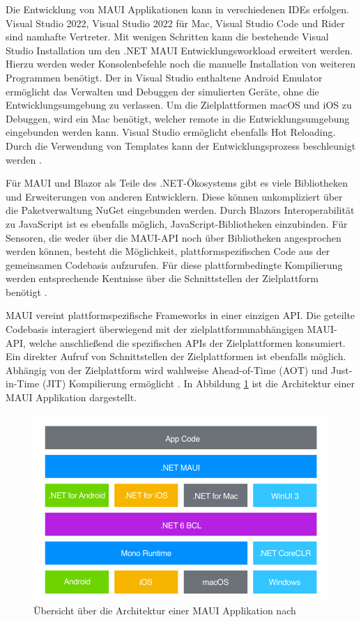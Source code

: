 \documentclass[]{lni}
\begin{document}
Die Entwicklung von MAUI Applikationen kann in verschiedenen IDEs erfolgen. Visual Studio 2022, Visual Studio 2022 für Mac, Visual Studio Code und Rider sind namhafte Vertreter. Mit wenigen Schritten kann die bestehende Visual Studio Installation um den .NET MAUI Entwicklungsworkload erweitert werden. Hierzu werden weder Konsolenbefehle noch die manuelle Installation von weiteren Programmen benötigt. Der in Visual Studio enthaltene Android Emulator ermöglicht das Verwalten und Debuggen der simulierten Geräte, ohne die Entwicklungsumgebung zu verlassen. Um die Zielplattformen macOS und iOS zu Debuggen, wird ein Mac benötigt, welcher remote in die Entwicklungsumgebung eingebunden werden kann. Visual Studio ermöglicht ebenfalls Hot Reloading. Durch die Verwendung von Templates kann der Entwicklungsprozess beschleunigt werden \cite{Davidbritch.04.12.2022b}. 

Für MAUI und Blazor als Teile des .NET-Ökosystems gibt es viele Bibliotheken und Erweiterungen von anderen Entwicklern. Diese können unkompliziert über die Paketverwaltung NuGet eingebunden werden. Durch Blazors Interoperabilität zu JavaScript ist es ebenfalls möglich, JavaScript-Bibliotheken einzubinden. Für Sensoren, die weder über die MAUI-API noch über Bibliotheken angesprochen werden können, besteht die Möglichkeit, plattformspezifischen Code aus der gemeinsamen Codebasis aufzurufen. Für diese plattformbedingte Kompilierung werden entsprechende Kentnisse über die Schnittstellen der Zielplattform benötigt \cite{Davidbritch.06.11.2022}. 

MAUI vereint plattformspezifische Frameworks in einer einzigen API. Die geteilte Codebasis interagiert überwiegend mit der zielplattformunabhängigen MAUI-API, welche anschließend die spezifischen APIs der Zielplattformen konsumiert. Ein direkter Aufruf von Schnittstellen der Zielplattformen ist ebenfalls möglich. Abhängig von der Zielplattform wird wahlweise Ahead-of-Time (AOT) und Just-in-Time (JIT) Kompilierung ermöglicht \cite{Davidbritch.04.12.2022c}. In Abbildung \ref{fig:mauiOverview} ist die Architektur einer MAUI Applikation dargestellt.

\begin{figure}[h]
	\centering
	\includegraphics[width=0.8\linewidth]{images/maui_overview.png}
	\caption{Übersicht über die Architektur einer MAUI Applikation nach \cite{Davidbritch.04.12.2022c}}
	\label{fig:mauiOverview}
\end{figure}
\end{document}
